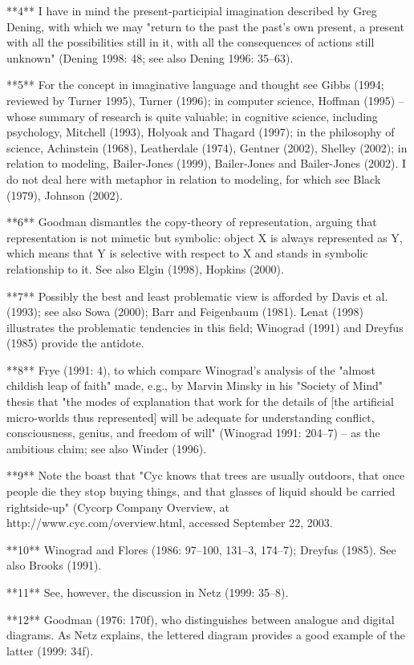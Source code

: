 **4** I have in mind the present-participial imagination described by Greg Dening, with which we may "return to the past the past's own present, a present with all the possibilities still in it, with all the consequences of actions still unknown" (Dening 1998: 48; see also Dening 1996: 35–63).

**5** For the concept in imaginative language and thought see Gibbs (1994; reviewed by Turner 1995), Turner (1996); in computer science, Hoffman (1995) – whose summary of research is quite valuable; in cognitive science, including psychology, Mitchell (1993), Holyoak and Thagard (1997); in the philosophy of science, Achinstein (1968), Leatherdale (1974), Gentner (2002), Shelley (2002); in relation to modeling, Bailer-Jones (1999), Bailer-Jones and Bailer-Jones (2002). I do not deal here with metaphor in relation to modeling, for which see Black (1979), Johnson (2002).

**6** Goodman dismantles the copy-theory of representation, arguing that representation is not mimetic but symbolic: object X is always represented as Y, which means that Y is selective with respect to X and stands in symbolic relationship to it. See also Elgin (1998), Hopkins (2000).

**7** Possibly the best and least problematic view is afforded by Davis et al. (1993); see also Sowa (2000); Barr and Feigenbaum (1981). Lenat (1998) illustrates the problematic tendencies in this field; Winograd (1991) and Dreyfus (1985) provide the antidote.

**8** Frye (1991: 4), to which compare Winograd's analysis of the "almost childish leap of faith" made, e.g., by Marvin Minsky in his "Society of Mind" thesis that "the modes of explanation that work for the details of [the artificial micro-worlds thus represented] will be adequate for understanding conflict, consciousness, genius, and freedom of will" (Winograd 1991: 204–7) – as the ambitious claim; see also Winder (1996).

**9** Note the boast that "Cyc knows that trees are usually outdoors, that once people die they stop buying things, and that glasses of liquid should be carried rightside-up" (Cycorp Company Overview, at http://www.cyc.com/overview.html, accessed September 22, 2003.

**10** Winograd and Flores (1986: 97–100, 131–3, 174–7); Dreyfus (1985). See also Brooks (1991).

**11** See, however, the discussion in Netz (1999: 35–8).

**12** Goodman (1976: 170f), who distinguishes between analogue and digital diagrams. As Netz explains, the lettered diagram provides a good example of the latter (1999: 34f).

